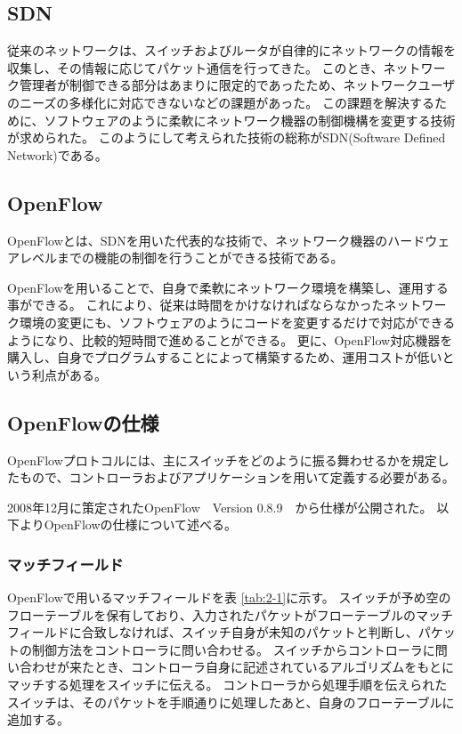\subsection{SDN}

従来のネットワークは、スイッチおよびルータが自律的にネットワークの情報を収集し、その情報に応じてパケット通信を行ってきた\cite{openflownet}。
このとき、ネットワーク管理者が制御できる部分はあまりに限定的であったため、ネットワークユーザのニーズの多様化に対応できないなどの課題があった。
この課題を解決するために、ソフトウェアのように柔軟にネットワーク機器の制御機構を変更する技術が求められた。
このようにして考えられた技術の総称がSDN(Software Defined Network)である。

\subsection{OpenFlow}

OpenFlowとは、SDNを用いた代表的な技術で、ネットワーク機器のハードウェアレベルまでの機能の制御を行うことができる技術である\cite{openflowjapanese}。

OpenFlowを用いることで、自身で柔軟にネットワーク環境を構築し、運用する事ができる。
これにより、従来は時間をかけなければならなかったネットワーク環境の変更にも、ソフトウェアのようにコードを変更するだけで対応ができるようになり、比較的短時間で進めることができる。
更に、OpenFlow対応機器を購入し、自身でプログラムすることによって構築するため、運用コストが低いという利点がある。

\subsection{OpenFlowの仕様}

OpenFlowプロトコルには、主にスイッチをどのように振る舞わせるかを規定したもので、コントローラおよびアプリケーションを用いて定義する必要がある。


2008年12月に策定されたOpenFlow　Version 0.8.9\cite{openflow}　から仕様が公開された。
以下よりOpenFlowの仕様について述べる。

\subsubsection{マッチフィールド}

OpenFlowで用いるマッチフィールドを表 \ref{tab:2-1}に示す\cite{openflow}。
スイッチが予め空のフローテーブルを保有しており、入力されたパケットがフローテーブルのマッチフィールドに合致しなければ、スイッチ自身が未知のパケットと判断し、パケットの制御方法をコントローラに問い合わせる。
スイッチからコントローラに問い合わせが来たとき、コントローラ自身に記述されているアルゴリズムをもとにマッチする処理をスイッチに伝える。
コントローラから処理手順を伝えられたスイッチは、そのパケットを手順通りに処理したあと、自身のフローテーブルに追加する。

